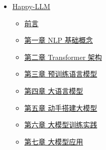 \documentclass[
]{article}
\author{}
\date{}
\providecommand{\tightlist}{%
  \setlength{\itemsep}{0pt}\setlength{\parskip}{0pt}}
\begin{document}
{
\setcounter{tocdepth}{3}
\tableofcontents
}
\begin{itemize}
\tightlist
\item
  \href{./README.md}{Happy-LLM}

  \begin{itemize}
  \tightlist
  \item
    \href{./前言.md}{前言}
  \item
    \href{./chapter1/第一章\%20NLP基础概念.md}{第一章 NLP 基础概念}
  \item
    \href{./chapter2/第二章\%20Transformer架构.md}{第二章 Transformer
    架构}
  \item
    \href{./chapter3/第三章\%20预训练语言模型.md}{第三章 预训练语言模型}
  \item
    \href{./chapter4/第四章\%20大语言模型.md}{第四章 大语言模型}
  \item
    \href{./chapter5/第五章\%20动手搭建大模型.md}{第五章 动手搭建大模型}
  \item
    \href{./chapter6/第六章\%20大模型训练流程实践.md}{第六章
    大模型训练实践}
  \item
    \href{./chapter7/第七章\%20大模型应用.md}{第七章 大模型应用}
  \end{itemize}
\end{itemize}
\end{document}
